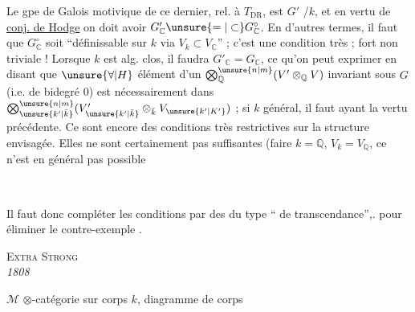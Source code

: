 Le gpe de Galois motivique de ce dernier, rel. à $T_{\mathrm{DR}}$, est    $G'$ /$k$,  et en vertu de \uline{conj. de Hodge} on doit avoir $G'_{\mathbb C}\unsure{=|\subset}G^\circ_{\mathbb C}$.  En d'autres termes, il faut que $G^\circ_{\mathbb C}$ soit ``définissable sur $k$ via $V_k\subset V_{\mathbb C}$'' ; c'est une condition très ; fort non triviale ! Lorsque $k$ est alg. clos, il faudra  $G'_{\mathbb C}=G_{\mathbb C}$, ce qu'on peut exprimer en disant que $\unsure{\forall|H}$  élément d'un ${\bigotimes}_{\mathbb Q}^{\unsure{n|m}}(V'\otimes_{\mathbb Q}V)$ invariant sous $G$ (i.e. de bidegré $0$) est nécessairement dans $\bigotimes_{\unsure{k'|\bar k}}^{\unsure{n|m}}(V'_{\unsure{k'|\bar k}}\otimes_{\bar k}V_{\unsure{k'|K'}})$\unsure{!} ; si $k$ général, il faut   ayant la vertu précédente. Ce sont encore des conditions très restrictives sur la structure envisagée. Elles ne sont certainement pas suffisantes (faire $k=\mathbb Q$, $V_k=V_{\mathbb Q}$, ce n'est en général pas possible
{\centering \textsc{}\\
\textit{ }\par}


Il faut donc compléter les conditions   par des   du type `` de transcendance'',. pour éliminer le contre-exemple .

{\centering \textsc{Extra Strong}\\
\textit{ 1808}\par}


$\mathcal M$ $\otimes$-catégorie sur corps $k$,
diagramme de corps


